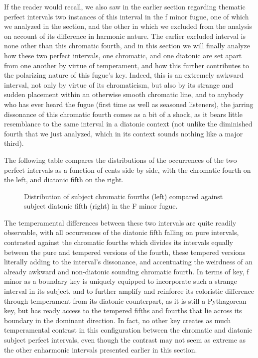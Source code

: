 If the reader would recall, we also saw in the earlier section regarding
thematic perfect intervals two instances of this interval in the f minor
fugue, one of which we analyzed in the section, and the other in which
we excluded from the analysis on account of its difference in harmonic
nature. The earlier excluded interval is none other than this chromatic
fourth, and in this section we will finally analyze how these two
perfect intervals, one chromatic, and one diatonic are set apart from
one another by virtue of temperament, and how this further contributes
to the polarizing nature of this fugue's key. Indeed, this is an
extremely awkward interval, not only by virtue of its chromaticism, but
also by its strange and sudden placement within an otherwise smooth
chromatic line, and to anybody who has ever heard the fugue (first time
as well as seasoned listeners), the jarring dissonance of this chromatic
fourth comes as a bit of a shock, as it bears little resemblance to the
same interval in a diatonic context (not unlike the diminished fourth
that we just analyzed, which in its context sounds nothing like a major
third).

The following table compares the distributions of the occurrences of the
two perfect intervals as a function of cents side by side, with the
chromatic fourth on the left, and diatonic fifth on the right.



\begin{figure}[H]
\vspace{1.5em}
    \centering
    \caption[Distribution of subject chromatic fourths compared against subject diatonic fifth in the F minor fugue. ]{Distribution of subject chromatic fourths (left) compared against subject diatonic fifth (right) in the F minor fugue.}
\end{figure}    The temperamental differences between these two intervals are quite
readily observable, with all occurrences of the diatonic fifth falling
on pure intervals, contrasted against the chromatic fourths which
divides its intervals equally between the pure and tempered versions of
the fourth, these tempered versions literally adding to the interval's
dissonance, and accentuating the weirdness of an already awkward and
non-diatonic sounding chromatic fourth. In terms of key, f minor as a
boundary key is uniquely equipped to incorporate such a strange interval
in its subject, and to further amplify and reinforce its coloristic
difference through temperament from its diatonic counterpart, as it is
still a Pythagorean key, but has ready access to the tempered fifths and
fourths that lie across its boundary in the dominant direction. In fact,
no other key creates as much temperamental contrast in this
configuration between the chromatic and diatonic subject perfect
intervals, even though the contrast may not seem as extreme as the other
enharmonic intervals presented earlier in this section.

